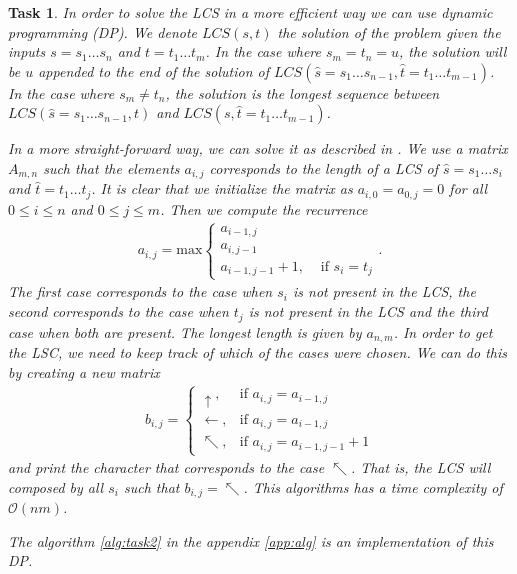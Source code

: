 \documentclass[11pt]{article} %
\theoremstyle{problemstyle}
\newtheorem{exercise}{Task}	%
\theoremstyle{problemstyle}
\renewcommand*{\O}{\mathcal{O}}
\begin{document}
\begin{exercise}  %
In order to solve the LCS in a more efficient way we can use dynamic programming (DP). We denote $LCS(s,t)$ the solution of the problem given the inputs $s=s_1\dots s_n$ and $t=t_1\dots t_m$. In the case where $s_m = t_n = u$, the solution will be $u$ appended to the end of the solution of $LCS(\hat{s}=s_1\dots s_{n-1}, \hat{t}=t_1\dots t_{m-1})$. In the case where $s_m \neq t_n$, the solution is the longest sequence between $LCS(\hat{s}=s_1\dots s_{n-1}, t)$ and $LCS(s, \hat{t}=t_1\dots t_{m-1})$. 

In a more straight-forward way, we can solve it as described in \cite{jones}. We use a matrix $A_{m,n}$ such that the elements $a_{i,j}$ corresponds to the length of a LCS of $\hat{s}=s_1\dots s_{i}$ and $\hat{t}=t_1\dots t_{j}$. It is clear that we initialize the matrix as $a_{i,0} = a_{0,j} = 0$ for all $0\leq i \leq n$ and $0\leq j \leq m$. Then we compute the recurrence
\begin{align*}
		a_{i,j} = \text{max}
	\begin{cases}
	a_{i-1,j} &\\
	a_{i,j-1} &\\
	a_{i-1,j-1}+1, &\text{ if } s_i=t_j 
	\end{cases}
	\text{.}
\end{align*}
The first case corresponds to the case when $s_i$ is not present in the LCS, the second corresponds to the case when $t_j$ is not present in the LCS and the third case when both are present. The longest length is given by $a_{n,m}$. In order to get the LSC, we need to keep track of which of the cases were chosen. We can do this by creating a new matrix 
\begin{align*}
	b_{i,j} =
	\begin{cases}
	\uparrow, &\text{if } a_{i,j}=a_{i-1,j} \\
	\leftarrow, &\text{if } a_{i,j}=a_{i-1,j} \\
	\nwarrow, &\text{if } a_{i,j}=a_{i-1,j-1} +1
	\end{cases}
\end{align*}
and print the character that corresponds to the case $\nwarrow$. That is, the LCS will composed by all $s_i$ such that $b_{i,j}= \nwarrow$. This algorithms has a time complexity of $\O(nm)$.

The algorithm \ref{alg:task2} in the appendix \ref{app:alg} is an implementation of this DP.

\end{exercise}
\end{document}
